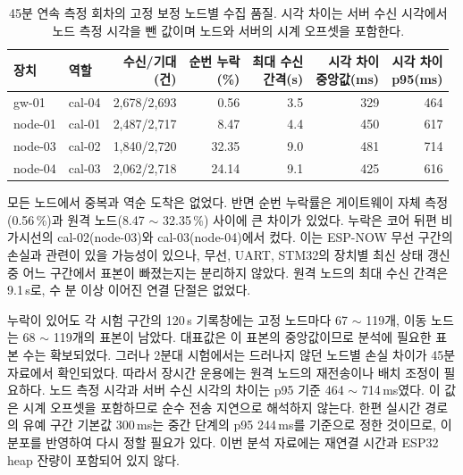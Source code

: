 \documentclass[11pt,a4paper]{article}
\begin{document}
\begin{table}[htbp]
  \centering\small
  \caption{45분 연속 측정 회차의 고정 보정 노드별 수집 품질. 시각 차이는 서버 수신 시각에서 노드 측정 시각을 뺀 값이며
  노드와 서버의 시계 오프셋을 포함한다.}
  \label{tab:quality}
  \begin{tabular}{@{}llrrrrr@{}}
    \toprule
    장치 & 역할 & \shortstack{수신/기대\\(건)} & \shortstack{순번 누락\\(\%)} & \shortstack{최대 수신\\간격(s)} &
    \shortstack{시각 차이\\중앙값(ms)} & \shortstack{시각 차이\\p95(ms)} \\
    \midrule
    gw-01   & cal-04 & 2,678/2,693 & 0.56  & 3.5 & 329 & 464 \\
    node-01 & cal-01 & 2,487/2,717 & 8.47  & 4.4 & 450 & 617 \\
    node-03 & cal-02 & 1,840/2,720 & 32.35 & 9.0 & 481 & 714 \\
    node-04 & cal-03 & 2,062/2,718 & 24.14 & 9.1 & 425 & 616 \\
    \bottomrule
  \end{tabular}
\end{table}

모든 노드에서 중복과 역순 도착은 없었다. 반면 순번 누락률은 게이트웨이 자체 측정(0.56\,\%)과 원격 노드(8.47 $\sim$
32.35\,\%) 사이에 큰 차이가 있었다. 누락은 코어 뒤편 비가시선의 cal-02(node-03)와 cal-03(node-04)에서 컸다. 이는
ESP-NOW 무선 구간의 손실과 관련이 있을 가능성이 있으나, 무선, UART, STM32의 장치별 최신 상태 갱신 중 어느 구간에서
표본이 빠졌는지는 분리하지 않았다. 원격 노드의 최대 수신 간격은 9.1\,s로, 수 분 이상 이어진 연결 단절은 없었다.

누락이 있어도 각 시험 구간의 120\,s 기록창에는 고정 노드마다 67 $\sim$ 119개, 이동 노드는 68 $\sim$ 119개의 표본이
남았다. 대표값은 이 표본의 중앙값이므로 분석에 필요한 표본 수는 확보되었다. 그러나 2분대 시험에서는 드러나지 않던
노드별 손실 차이가 45분 자료에서 확인되었다. 따라서 장시간 운용에는 원격 노드의 재전송이나 배치 조정이 필요하다.
노드 측정 시각과 서버 수신 시각의 차이는 p95 기준 464 $\sim$ 714\,ms였다. 이 값은 시계 오프셋을 포함하므로 순수
전송 지연으로 해석하지 않는다. 한편 실시간 경로의 유예 구간 기본값 300\,ms는 중간 단계의 p95 244\,ms를 기준으로
정한 것이므로, 이 분포를 반영하여 다시 정할 필요가 있다. 이번 분석 자료에는 재연결 시간과 ESP32 heap 잔량이 포함되어
있지 않다.
\end{document}
